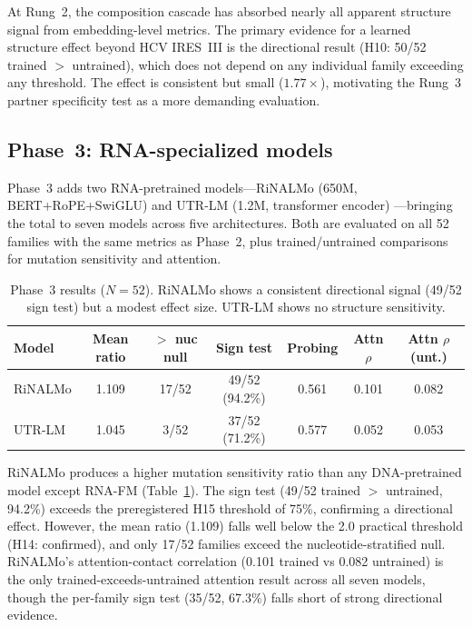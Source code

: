 \documentclass[11pt]{article}
\begin{document}
At Rung~2, the composition cascade has absorbed nearly all apparent
structure signal from embedding-level metrics.  The primary evidence
for a learned structure effect beyond HCV IRES~III is the directional
result (H10: 50/52 trained $>$ untrained), which does not depend on
any individual family exceeding any threshold.  The effect is
consistent but small ($1.77\times$), motivating the Rung~3 partner
specificity test as a more demanding evaluation.

\subsection{Phase~3: RNA-specialized models}
\label{sec:phase3}

Phase~3 adds two RNA-pretrained models---RiNALMo (650M,
BERT+RoPE+SwiGLU) \citep{penic2024rinalmo} and UTR-LM (1.2M,
transformer encoder) \citep{chu2024utrlm}---bringing the total to
seven models across five architectures.  Both are evaluated on all 52
families with the same metrics as Phase~2, plus trained/untrained
comparisons for mutation sensitivity and attention.

\begin{table}[t]
\centering
\caption{Phase~3 results ($N = 52$).  RiNALMo shows a consistent
  directional signal (49/52 sign test) but a modest effect size.
  UTR-LM shows no structure sensitivity.}
\label{tab:phase3}
\begin{tabular}{@{}lcccccc@{}}
\toprule
\textbf{Model} & \textbf{Mean ratio} & \textbf{$>$ nuc null} &
  \textbf{Sign test} & \textbf{Probing} &
  \textbf{Attn $\rho$} & \textbf{Attn $\rho$ (unt.)} \\
\midrule
RiNALMo & 1.109 & 17/52 & 49/52 (94.2\%) & 0.561 & 0.101 & 0.082 \\
UTR-LM  & 1.045 & 3/52  & 37/52 (71.2\%) & 0.577 & 0.052 & 0.053 \\
\bottomrule
\end{tabular}
\end{table}

RiNALMo produces a higher mutation sensitivity ratio than any
DNA-pretrained model except RNA-FM (Table~\ref{tab:phase3}).  The
sign test (49/52 trained $>$ untrained, 94.2\%) exceeds the
preregistered H15 threshold of 75\%, confirming a directional effect.
However, the mean ratio (1.109) falls well below the 2.0 practical
threshold (H14: confirmed), and only 17/52 families exceed the
nucleotide-stratified null.  RiNALMo's attention-contact correlation
(0.101 trained vs 0.082 untrained) is the only trained-exceeds-untrained
attention result across all seven models, though the per-family sign
test (35/52, 67.3\%) falls short of strong directional evidence.
\end{document}
